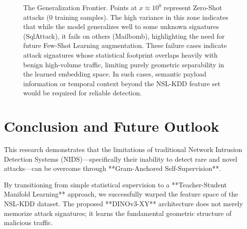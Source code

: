 \documentclass[
  10pt,
  twocolumn,
  a4paper,
  parskip=half
]{scrartcl}
\begin{document}
\begin{figure}[H]
        \caption{The Generalization Frontier. Points at $x \approx 10^0$ represent Zero-Shot attacks (0 training samples). The high variance in this zone indicates that while the model generalizes well to some unknown signatures (SqlAttack), it fails on others (Mailbomb), highlighting the need for future Few-Shot Learning augmentation. These failure cases indicate attack signatures whose statistical footprint overlaps heavily with benign high-volume traffic, limiting purely geometric separability in the learned embedding space. In such cases, semantic payload information or temporal context beyond the NSL-KDD feature set would be required for reliable detection.}
        \label{fig:data_efficiency}
    \end{figure}

    \section{Conclusion and Future Outlook}
    This research demonstrates that the limitations of traditional Network Intrusion Detection Systems (NIDS)—specifically their inability to detect rare and novel attacks—can be overcome through **Gram-Anchored Self-Supervision**.

    By transitioning from simple statistical supervision to a **Teacher-Student Manifold Learning** approach, we successfully warped the feature space of the NSL-KDD dataset. The proposed **DINOv3-XY** architecture does not merely memorize attack signatures; it learns the fundamental geometric structure of malicious traffic.
\end{document}
